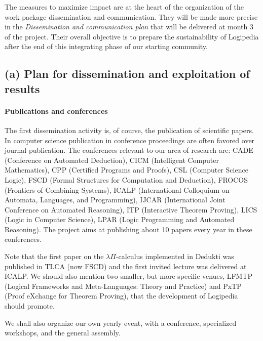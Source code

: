The measures to maximize impact are at the heart of the organization
of the work package dissemination and communication. They will be made
more precise
in the {\em Dissemination and communication plan} that will be
delivered at month 3 of the project. Their overall objective is to
prepare the sustainability of Logipedia after the end of this
integrating phase of our starting community.

\subsection*{(a) Plan for dissemination and exploitation of results}
\label{sec:dissemination}

\paragraph*{Publications and conferences}

The first dissemination activity is, of course, the publication of
scientific papers. In computer science publication in conference
proceedings are often favored over journal publication. The
conferences relevant to our area of research are:
CADE (Conference on Automated Deduction),
CICM (Intelligent Computer Mathematics),
CPP (Certified Programs and Proofs),
CSL (Computer Science Logic),
FSCD (Formal Structures for Computation and Deduction),
FROCOS (Frontiers of Combining Systems),
ICALP (International Colloquium on Automata, Languages, and Programming),
IJCAR (International Joint Conference on Automated Reasoning),
ITP (Interactive Theorem Proving),
LICS (Logic in Computer Science),
LPAR (Logic Programming and Automated Reasoning).
The project aims at publishing about 10 papers every year in these conferences.

Note that the first paper on the $\lambda\Pi$-calculus implemented in
Dedukti was published in TLCA (now FSCD) and the first invited lecture
was delivered at ICALP. We should also mention two smaller, but more
specific venues, LFMTP (Logical Frameworks and Meta-Languages: Theory
and Practice) and PxTP (Proof eXchange for Theorem Proving), that the
development of Logipedia should promote.

We shall also organize our own yearly event, with a conference,
specialized workshops, and the general assembly.

